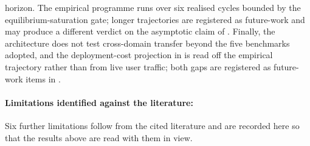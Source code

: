 horizon. The empirical programme runs over six realised cycles bounded by the equilibrium-saturation gate; longer trajectories are registered as future-work and may produce a different verdict on the asymptotic claim of . Finally, the architecture does not test cross-domain transfer beyond the five benchmarks adopted, and the deployment-cost projection in  is read off the empirical trajectory rather than from live user traffic; both gaps are registered as future-work items in .

\paragraph{Limitations identified against the literature:} Six further limitations follow from the cited literature and are recorded here so that the results above are read with them in view.
